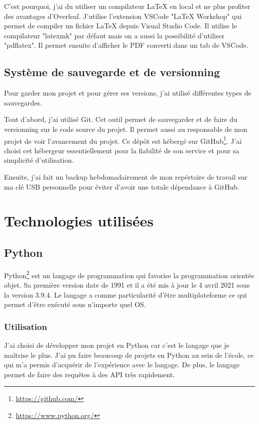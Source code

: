 \documentclass[a4paper,14pt]{extarticle}
\begin{document}
{C'est pourquoi, j'ai du utiliser un compilateur \LaTeX{} en local et ne plus profiter des avantages d'Overleaf. J'utilise l'extension VSCode "LaTeX Workshop" qui permet de compiler un fichier \LaTeX{} depuis Visual Studio Code. Il utilise le compilateur "latexmk" par défaut mais on a aussi la possibilité d'utiliser "pdflatex". Il permet ensuite d'afficher le PDF converti dans un tab de VSCode.

\subsection{Système de sauvegarde et de versionning}

Pour garder mon projet et pour gérer ses versions, j'ai utilisé différentes types de sauvegardes.

Tout d'abord, j'ai utilisé Git. Cet outil permet de sauvegarder et de faire du versionning sur le code source du projet. Il permet aussi au responsable de mon projet de voir l'avancement du projet. Ce dépôt est hébergé sur GitHub\footnote{\url{https://github.com/}}. J'ai choisi cet hébergeur essentiellement pour la fiabilité de son service et pour sa simplicité d'utilisation. 

Ensuite, j'ai fait un backup hebdomadairement de mon repértoire de travail sur ma clé USB personnelle pour éviter d'avoir une totale dépendance à GitHub. 

\section{Technologies utilisées}

\subsection{Python}
Python\footnote{\url{https://www.python.org/}} est un langage de programmation qui favorise la programmation orientée objet. Sa première version date de 1991 et il a été mis à jour le 4 avril 2021 sous la version 3.9.4. Le langage a comme particularité d'être multiplateforme ce qui permet d'être exécuté sous n'importe quel OS.

\subsubsection{Utilisation}
J'ai choisi de développer mon projet en Python car c'est le langage que je maîtrise le plus. J'ai pu faire beaucoup de projets en Python au sein de l'école, ce qui m'a permis d'acquérir de l'expérience avec le langage. De plus, le langage permet de faire des requêtes à des API très rapidement.

}
\end{document}
